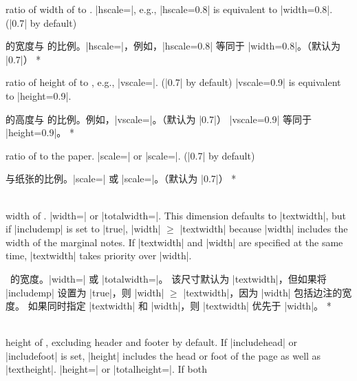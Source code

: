 \begin{Options}
\begin{paracol}{2}
\item[hscale]
ratio of width of  to . 
|hscale=|, e.g., |hscale=0.8| is equivalent to
|width=0.8|. (|0.7| by default)
\switchcolumn
\item[hscale] 的宽度与  的比例。|hscale=|，例如，|hscale=0.8| 等同于 |width=0.8|。（默认为 |0.7|）   
   \switchcolumn[0]*   
\item[vscale]
   ratio of height of  to , e.g.,
   |vscale=|. (|0.7| by default) |vscale=0.9| is equivalent
   to |height=0.9|.
\switchcolumn
\item[vscale] 的高度与  的比例。例如，|vscale=|。（默认为 |0.7|）
|vscale=0.9| 等同于 |height=0.9|。
\switchcolumn[0]*
\item[scale] ratio of  to the paper.
   |scale=| or |scale=|.
   (|0.7| by default)
\switchcolumn
\item[scale] 与纸张的比例。|scale=| 或 |scale=|。（默认为 |0.7|）
\switchcolumn[0]*
\item[width\OR totalwidth] ~\\
width of . |width=| or
|totalwidth=|. This dimension defaults to |textwidth|,
but if |includemp| is set to |true|, |width| $\ge$ |textwidth| 
because |width| includes the width of the marginal notes.
If |textwidth| and |width| are specified at the same time, 
|textwidth| takes priority over |width|.
\switchcolumn
\item[width\OR totalwidth] \
的宽度。|width=| 或 |totalwidth=|。
该尺寸默认为 |textwidth|，但如果将 |includemp| 设置为 |true|，则 |width| $\ge$ |textwidth|，因为 |width| 包括边注的宽度。
如果同时指定 |textwidth| 和 |width|，则 |textwidth| 优先于 |width|。
\switchcolumn[0]*
\item[height\OR totalheight] ~\\
height of , excluding header and footer by default.
If |includehead| or |includefoot| is set, |height| includes
the head or foot of the page as well as |textheight|.
|height=| or |totalheight=|\meta{length}. If both

\end{paracol}
\end{Options}
